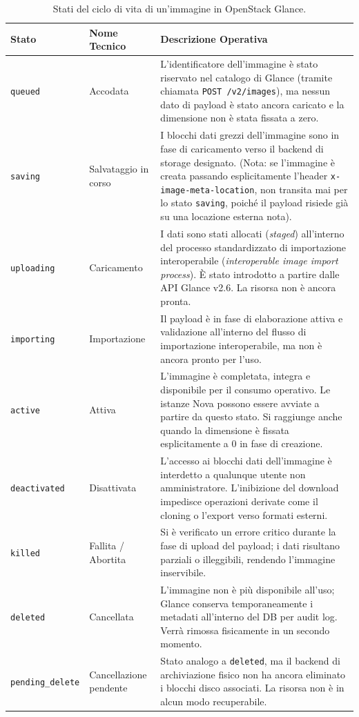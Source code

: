 \documentclass[11pt, a4paper]{article}
\begin{document}
\begin{table}[H]
\centering
\small
\begin{tabularx}{\textwidth}{l p{3.2cm} X}
\toprule
\textbf{Stato} & \textbf{Nome Tecnico} & \textbf{Descrizione Operativa} \\
\midrule
\texttt{queued} & Accodata & L'identificatore dell'immagine è stato riservato nel catalogo di Glance (tramite chiamata \texttt{POST /v2/images}), ma nessun dato di payload è stato ancora caricato e la dimensione non è stata fissata a zero. \\
\addlinespace
\texttt{saving} & Salvataggio in corso & I blocchi dati grezzi dell'immagine sono in fase di caricamento verso il backend di storage designato. (Nota: se l'immagine è creata passando esplicitamente l'header \texttt{x-image-meta-location}, non transita mai per lo stato \texttt{saving}, poiché il payload risiede già su una locazione esterna nota). \\
\addlinespace
\texttt{uploading} & Caricamento & I dati sono stati allocati (\emph{staged}) all'interno del processo standardizzato di importazione interoperabile (\emph{interoperable image import process}). È stato introdotto a partire dalle API Glance v2.6. La risorsa non è ancora pronta. \\
\addlinespace
\texttt{importing} & Importazione & Il payload è in fase di elaborazione attiva e validazione all'interno del flusso di importazione interoperabile, ma non è ancora pronto per l'uso. \\
\addlinespace
\texttt{active} & Attiva & L'immagine è completata, integra e disponibile per il consumo operativo. Le istanze Nova possono essere avviate a partire da questo stato. Si raggiunge anche quando la dimensione è fissata esplicitamente a 0 in fase di creazione. \\
\addlinespace
\texttt{deactivated} & Disattivata & L'accesso ai blocchi dati dell'immagine è interdetto a qualunque utente non amministratore. L'inibizione del download impedisce operazioni derivate come il cloning o l'export verso formati esterni. \\
\addlinespace
\texttt{killed} & Fallita / Abortita & Si è verificato un errore critico durante la fase di upload del payload; i dati risultano parziali o illeggibili, rendendo l'immagine inservibile. \\
\addlinespace
\texttt{deleted} & Cancellata & L'immagine non è più disponibile all'uso; Glance conserva temporaneamente i metadati all'interno del DB per audit log. Verrà rimossa fisicamente in un secondo momento. \\
\addlinespace
\texttt{pending\_delete} & Cancellazione pendente & Stato analogo a \texttt{deleted}, ma il backend di archiviazione fisico non ha ancora eliminato i blocchi disco associati. La risorsa non è in alcun modo recuperabile. \\
\bottomrule
\end{tabularx}
\caption{Stati del ciclo di vita di un'immagine in OpenStack Glance.}
\label{tab:glance_statuses}
\end{table}
\end{document}
